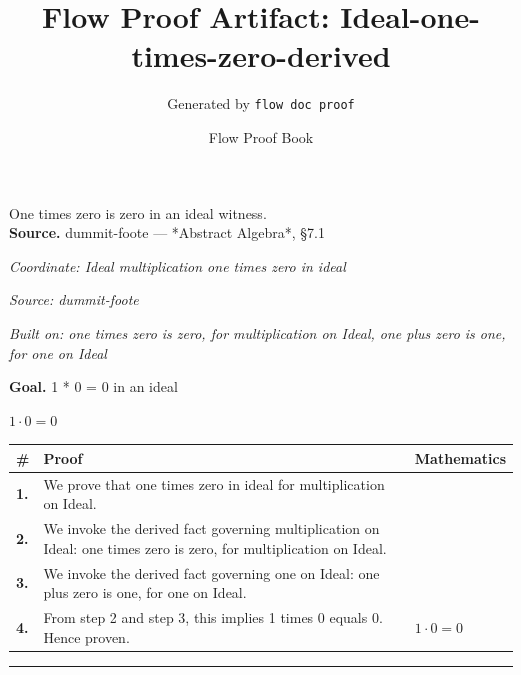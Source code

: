 \documentclass[11pt]{article}
\title{Flow Proof Artifact: Ideal-one-times-zero-derived}
\author{Generated by \texttt{flow doc proof}}
\date{Flow Proof Book}
\theoremstyle{definition}
\begin{document}
\maketitle
One times zero is zero in an ideal witness.\\[0.5em]
\textbf{Source.} dummit-foote — *Abstract Algebra*, §7.1\\[0.5em]
\bigskip
{}\par
\smallskip\noindent\textit{Coordinate: Ideal \cdot multiplication \cdot one times zero in ideal}\par
\smallskip\noindent\textit{Source: dummit-foote}\par
\smallskip\noindent\textit{Built on: one times zero is zero, for multiplication on Ideal, one plus zero is one, for one on Ideal}\par
\medskip
\noindent\textbf{Goal.} 1 * 0 = 0 in an ideal\par
\noindent$\displaystyle 1 \cdot 0 = 0$\par
\medskip
\noindent
\begin{tabular}{@{} >{\raggedright\arraybackslash}p{} >{\raggedright\arraybackslash}p{} >{\raggedleft\arraybackslash}p{} @{}}
\textbf{\#} & \textbf{Proof} & \textbf{Mathematics} \\
\midrule
\textbf{1.} & We prove that one times zero in ideal for multiplication on Ideal. & \\[0.45em]
\textbf{2.} & We invoke the derived fact governing multiplication on Ideal: one times zero is zero, for multiplication on Ideal. & \\[0.45em]
\textbf{3.} & We invoke the derived fact governing one on Ideal: one plus zero is one, for one on Ideal. & \\[0.45em]
\textbf{4.} & From step 2 and step 3, this implies 1 times 0 equals 0. Hence proven. & $\displaystyle 1 \cdot 0 = 0$ \\[0.45em]
\bottomrule
\end{tabular}
\label{thm:Ideal-multiplication-one_times_zero_in_ideal}
\par\medskip\hrule
\end{document}
